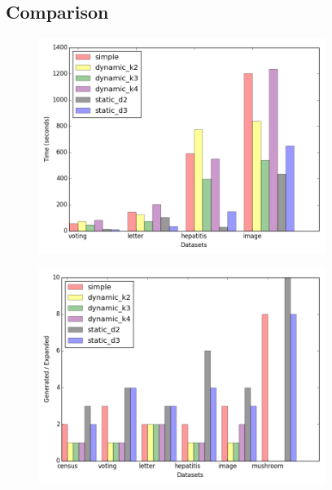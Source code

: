 \subsection{Comparison}

\begin{frame}
	\begin{figure}
		\centering
		\includegraphics[height=7cm]{./images/astar_time}
	\end{figure}
\end{frame}

\begin{frame}
	\begin{figure}
		\centering
		\includegraphics[height=7cm]{./images/astar_ratio}
	\end{figure}
\end{frame}